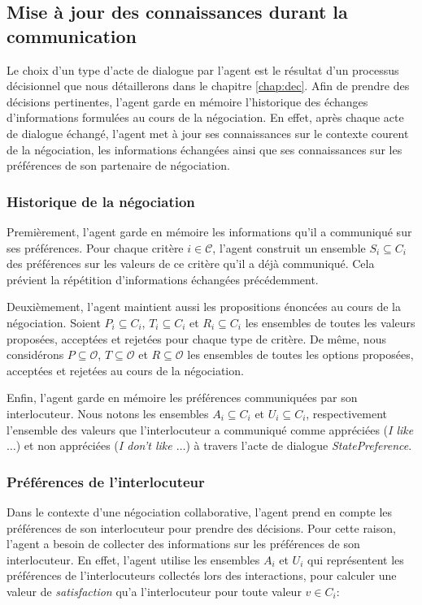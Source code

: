 \subsection{Mise à jour des connaissances durant la communication}

Le choix d'un type d'acte de dialogue par l'agent est le résultat d'un processus décisionnel que nous détaillerons dans le chapitre \ref{chap:dec}. 
Afin de prendre des décisions pertinentes, l'agent garde en mémoire l'historique des échanges d'informations formulées au cours de la négociation.  En effet, après chaque acte de dialogue échangé, l'agent met à jour ses connaissances sur le contexte courent de la négociation, les informations échangées ainsi que ses connaissances sur les préférences de son partenaire de négociation.  

\subsubsection{Historique de la négociation}
Premièrement, l'agent garde en mémoire les informations qu'il a communiqué sur ses préférences.			
Pour chaque critère $i\in\mathcal{C}$, l'agent construit un ensemble $S_i \subseteq C_i$ des préférences sur les valeurs de ce critère qu'il a déjà communiqué. Cela prévient la répétition d'informations échangées précédemment. 

Deuxièmement, l'agent maintient aussi les propositions énoncées au cours de la négociation. Soient $P_i \subseteq C_i$, $T_i\subseteq C_i$ et $R_i\subseteq C_i$ les ensembles de toutes les valeurs proposées, acceptées et rejetées pour chaque type de critère. 
De même, nous considérons $P\subseteq \mathcal{O}$, $T\subseteq \mathcal{O}$ et $R\subseteq \mathcal{O}$ les ensembles de toutes les options proposées, acceptées et rejetées au cours de la négociation.


Enfin, l'agent garde en mémoire les préférences communiquées par son interlocuteur. Nous notons les ensembles $A_i\subseteq C_i$ et $U_i\subseteq C_i$, respectivement l'ensemble des valeurs que l'interlocuteur a communiqué comme appréciées (\textit{I like $\ldots$}) et non appréciées  (\textit{I don't like $\ldots$}) à travers l'acte de dialogue \textit{StatePreference}.



\subsubsection{Préférences de  l'interlocuteur}
Dans le contexte d'une négociation collaborative, l'agent prend en compte les préférences de son interlocuteur pour prendre des décisions. Pour cette raison, l'agent a besoin de collecter des informations sur les préférences de son interlocuteur. En effet, l'agent utilise les ensembles $A_i$ et $U_i$ qui représentent les préférences de l'interlocuteurs collectés lors des interactions, pour calculer une valeur de \emph{satisfaction}  qu'a l'interlocuteur pour toute valeur $v\in C_i$: 

